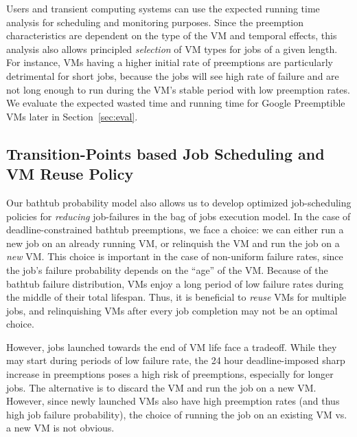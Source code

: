 \documentclass[compsoc]{IEEEtran}
\newcommand{\subsecspace}[0]{-0.20cm}
\begin{document}
Users and transient computing systems can use the expected running time analysis for scheduling and monitoring purposes.
Since the preemption characteristics are dependent on the type of the VM and temporal effects, this analysis also allows principled \emph{selection} of VM types for jobs of a given length. 
For instance, VMs having a higher initial rate of preemptions are particularly detrimental for short jobs, because the jobs will see high rate of failure and are not long enough to run during the VM's stable period with low  preemption rates. 
We evaluate the expected wasted time and running time for Google Preemptible VMs later in Section~\ref{sec:eval}. 

\vspace*{\subsecspace}
\subsection{Transition-Points based Job Scheduling and VM Reuse Policy}
\label{subsec:sched-policy}

Our bathtub probability model also allows us to develop optimized job-scheduling policies for \emph{reducing} job-failures in the bag of jobs execution model. 
In the case of deadline-constrained bathtub preemptions, we face a choice: we can either run a new job on an already running VM, or relinquish the VM and run the job on a \emph{new} VM. 
This choice is important in the case of non-uniform failure rates, since the job's failure probability depends on the ``age'' of the VM. 
Because of the bathtub failure distribution, VMs enjoy a long period of low failure rates during the middle of their total lifespan.
Thus, it is beneficial to \emph{reuse} VMs for multiple jobs, and relinquishing VMs after every job completion may not be an optimal choice. 


However, jobs launched towards the end of VM life face a tradeoff.
While they may start during periods of low failure rate, the 24 hour deadline-imposed sharp increase in preemptions poses a high risk of preemptions, especially for longer jobs.
The alternative is to discard the VM and run the job on a new VM. 
However, since newly launched VMs also have high preemption rates (and thus high job failure probability), the choice of running the job on an existing VM vs. a new VM is not obvious. 
\end{document}
